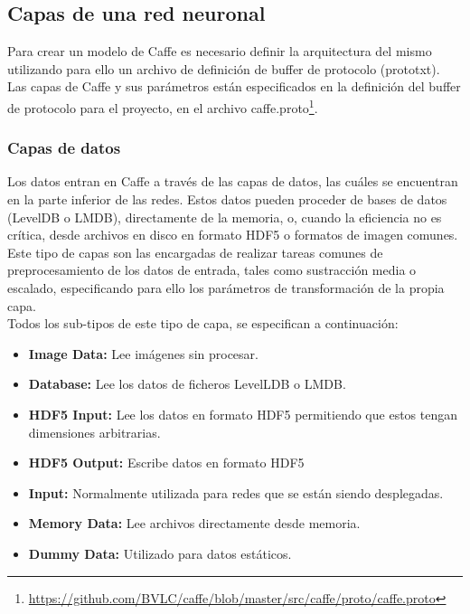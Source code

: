 \documentclass[a4paper, 12pt, oneside]{book}
\begin{document}
\subsection{Capas de una red neuronal}\label{CapaRedNeuronal}

Para crear un modelo de Caffe es necesario definir la arquitectura del mismo utilizando para ello un archivo de definición de buffer de protocolo (prototxt).\\

Las capas de Caffe y sus parámetros están especificados en la definición del buffer de protocolo para el proyecto, en el archivo caffe.proto\footnote{\url{https://github.com/BVLC/caffe/blob/master/src/caffe/proto/caffe.proto}}.

\subsubsection{Capas de datos}

Los datos entran en Caffe a través de las capas de datos, las cuáles se encuentran en la parte inferior de las redes. Estos datos pueden proceder de bases de datos (LevelDB o LMDB), directamente de la memoria, o, cuando la eficiencia no es crítica, desde archivos en disco en formato HDF5 o formatos de imagen comunes.\\

Este tipo de capas son las encargadas de realizar tareas comunes de preprocesamiento de los datos de entrada, tales como sustracción media o escalado, especificando para ello los parámetros de transformación de la propia capa.\\

Todos los sub-tipos de este tipo de capa, se especifican a continuación:

\begin{itemize}
\item \textbf{Image Data:} Lee imágenes sin procesar.
\item \textbf{Database:} Lee los datos de ficheros LevelLDB o LMDB.
\item \textbf{HDF5 Input:} Lee los datos en formato HDF5 permitiendo que estos tengan dimensiones arbitrarias.
\item \textbf{HDF5 Output:} Escribe datos en formato HDF5
\item \textbf{Input:} Normalmente utilizada para redes que se están siendo desplegadas.
\begin{comment}
\item \textbf{Window Data:}
\end{comment}
\item \textbf{Memory Data:} Lee archivos directamente desde memoria.
\item \textbf{Dummy Data:} Utilizado para datos estáticos.
\end{itemize}
\end{document}
